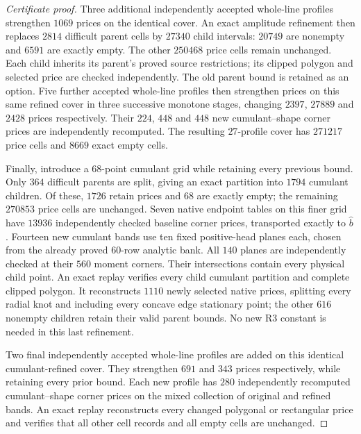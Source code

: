 \documentclass[11pt]{article}
\begin{document}
\begin{proof}[Certificate proof]
Three additional independently accepted whole-line profiles strengthen
$1069$ prices on the identical cover. An exact amplitude refinement
then replaces $2814$ difficult parent cells by $27340$ child intervals:
$20749$ are nonempty and $6591$ are exactly empty. The other $250468$
price cells remain unchanged. Each child inherits its parent's proved
source restrictions; its clipped polygon and selected price are checked
independently. The old parent bound is retained as an option. Five
further accepted whole-line profiles then strengthen prices on this
same refined cover in three successive monotone stages, changing
$2397$, $27889$ and $2428$ prices respectively. Their $224$, $448$ and
$448$ new cumulant--shape corner prices are independently recomputed.
The resulting $27$-profile cover has $271217$ price cells and $8669$
exact empty cells.

Finally, introduce a $68$-point cumulant grid while retaining every
previous bound. Only $364$ difficult parents are split, giving an exact
partition into $1794$ cumulant children. Of these, $1726$ retain prices
and $68$ are exactly empty; the remaining $270853$ price cells are
unchanged. Seven native endpoint tables on this finer grid have $13936$
independently checked baseline corner prices, transported exactly to
$\widehat b$. Fourteen new cumulant bands use ten fixed positive-head
planes each, chosen from the already proved $60$-row analytic bank.
All $140$ planes are independently checked at their $560$ moment
corners. Their intersections contain every physical child point.
An exact replay verifies every child cumulant partition and complete
clipped polygon. It reconstructs $1110$ newly selected native prices,
splitting every radial knot and including every concave edge stationary
point; the other $616$ nonempty children retain their valid parent bounds.
No new R3 constant is needed in this last refinement.

Two final independently accepted whole-line profiles are added on
this identical cumulant-refined cover. They strengthen $691$ and $343$
prices respectively, while retaining every prior bound. Each new profile
has $280$ independently recomputed cumulant--shape corner prices on
the mixed collection of original and refined bands. An exact replay
reconstructs every changed polygonal or rectangular price and verifies
that all other cell records and all empty cells are unchanged.


\end{proof}
\end{document}
